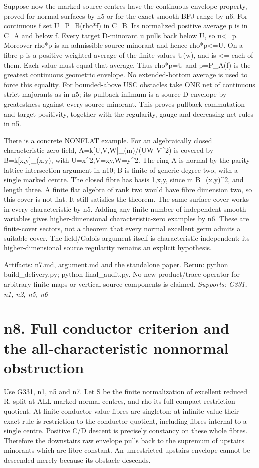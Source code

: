 \documentclass[11pt]{article}
\begin{document}
Suppose now the marked source centres have the continuous-envelope property, proved for normal surfaces by n5 or for the exact smooth BFJ range by n6. For continuous f set U=P\_B(rho*f) in C\_B. Its normalized positive average p is in C\_A and below f. Every target D-minorant u pulls back below U, so u<=p. Moreover rho*p is an admissible source minorant and hence rho*p<=U. On a fibre p is a positive weighted average of the finite values U(w), and is <= each of them. Each value must equal that average. Thus rho*p=U and p=P\_A(f) is the greatest continuous geometric envelope. No extended-bottom average is used to force this equality. For bounded-above USC obstacles take ONE net of continuous strict majorants as in n5; its pullback infimum is a source D-envelope by greatestness against every source minorant. This proves pullback commutation and target positivity, together with the regularity, gauge and decreasing-net rules in n5.

There is a concrete NONFLAT example. For an algebraically closed characteristic-zero field, A=k[U,V,W]\_(m)/(UW-V\textasciicircum{}2) is covered by B=k[x,y]\_(x,y), with U=x\textasciicircum{}2,V=xy,W=y\textasciicircum{}2. The ring A is normal by the parity-lattice intersection argument in n10; B is finite of generic degree two, with a single marked centre. The closed fibre has basis 1,x,y, since m B=(x,y)\textasciicircum{}2, and length three. A finite flat algebra of rank two would have fibre dimension two, so this cover is not flat. It still satisfies the theorem. The same surface cover works in every characteristic by n5. Adding any finite number of independent smooth variables gives higher-dimensional characteristic-zero examples by n6. These are finite-cover sectors, not a theorem that every normal excellent germ admits a suitable cover. The field/Galois argument itself is characteristic-independent; its higher-dimensional source regularity remains an explicit hypothesis.

Artifacts: n7.md, argument.md and the standalone paper. Rerun: python build\_delivery.py; python final\_audit.py. No new product/trace operator for arbitrary finite maps or vertical source components is claimed.
\textit{Supports: G331, n1, n2, n5, n6}

\section{n8. Full conductor criterion and the all-characteristic nonnormal obstruction}

Use G331, n1, n5 and n7. Let S be the finite normalization of excellent reduced R, split at ALL marked normal centres, and rho its full compact restriction quotient. At finite conductor value fibres are singleton; at infinite value their exact rule is restriction to the conductor quotient, including fibres internal to a single centre. Positive C/D descent is precisely constancy on these whole fibres. Therefore the downstairs raw envelope pulls back to the supremum of upstairs minorants which are fibre constant. An unrestricted upstairs envelope cannot be descended merely because its obstacle descends.
\end{document}
